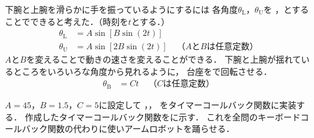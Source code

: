 



下腕と上腕を滑らかに手を振っているようにするには
各角度$\theta_{\mathrm{L}}$，$\theta_{\mathrm{U}}$を
，とすることでできると考えた．（時刻を$t$とする．）
\begin{align}
	\theta_{\mathrm{L}} &= A\sin[B\sin(2t)]\label{equ:theta-L}\\
	\theta_{\mathrm{U}} &= A\sin[2B\sin(2t)]\;\;\;\;（AとBは任意定数）\label{equ:theta-U}
\end{align}
$A$と$B$を変えることで動きの速さを変えることができる．
下腕と上腕が揺れているところをいろいろな角度から見れるように，
台座をで回転させる．
\begin{align}
	\theta_{\mathrm{B}} &= Ct\;\;\;\;（Cは任意定数）\label{equ:theta-B}
\end{align}



$A=45$，$B=1.5$，$C=5$に設定して
，，
をタイマーコールバック関数に実装する．
作成したタイマーコールバック関数をに示す．
これを全問のキーボードコールバック関数の代わりに使いアームロボットを踊らせる．


